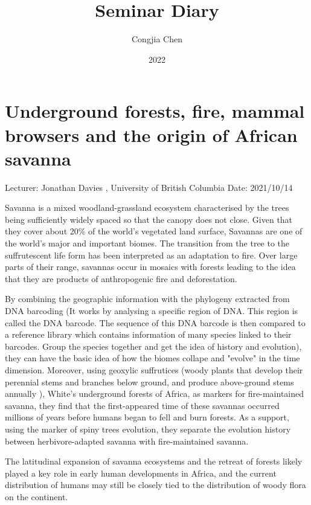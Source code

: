 \documentclass[11pt]{article}
\title{\textbf{Seminar Diary}}
\author{Congjia Chen\footnotemark[1]}
\date{2022}
\begin{document}
  \maketitle
  \newpage


\linenumbers
\section{Underground forests, fire, mammal browsers and the origin of African savanna}
Lecturer: Jonathan Davies , University of British Columbia
\newline
Date: 2021/10/14
\newline

Savanna is a mixed woodland-grassland ecosystem characterised by the trees being sufficiently widely spaced so that the canopy does not close. Given that they cover about 20\% of the world's vegetated land surface, Savannas are one of the world's major and important biomes. The transition from the tree to the suffrutescent life form has been interpreted as an adaptation to fire. Over large parts of their range, savannas occur in mosaics with forests leading to the idea that they are products of anthropogenic fire and deforestation. 

By combining the geographic information with the phylogeny extracted from DNA barcoding (It works by analysing a specific region of DNA. This region is called the DNA barcode. The sequence of this DNA barcode is then compared to a reference library which contains information of many species linked to their barcodes. Group the species together and get the idea of history and evolution), they can have the basic idea of how the biomes collape and "evolve" in the time dimension. Moreover, using geoxylic suffrutices (woody plants that develop their perennial stems and branches below ground, and produce above-ground stems annually ), White's underground forests of Africa, as markers for fire-maintained savanna, they find that the first-appeared time of these savannas occurred millions of years before humans began to fell and burn forests. As a support, using the marker of spiny trees evolution, they separate the evolution history between herbivore-adapted savanna with fire-maintained savanna.

The latitudinal expansion of savanna ecosystems and the retreat of forests likely played a key role in early human developments in Africa, and the current distribution of humans may still be closely tied to the distribution of woody flora on the continent.
    
\end{document}

